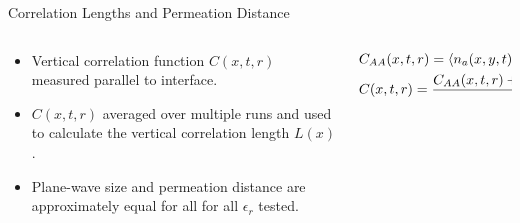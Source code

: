 \documentclass[aspectratio=169]{beamer}
\begin{document}
    \begin{frame}[t]{Correlation Lengths and Permeation Distance}
        \begin{columns}
            \begin{column}{0.3\textwidth}
                \vspace{-30pt}

                \begin{itemize}[leftmargin=1pt]
                \small
                    \item Vertical correlation function $ C(x,t, r) $ measured parallel
                        to interface.
                    \item $ C(x,t,r) $ averaged over multiple runs and used to calculate the vertical correlation length $ L(x) $.
                    \item Plane-wave size and permeation distance are approximately equal for all
                        for all $ \epsilon_r $ tested.
                \end{itemize}
            \end{column}
            \begin{column}{0.7\textwidth}
                
                \hfuzz=15pt
                \vspace{-15pt}

                \small{
                \begin{align*}
                    \hfill
                    &C_{AA}(x,t,r) = \braket{n_a(x, y, t)n_a(x, y+r, t)} - (a(x, t))^2
                    \hspace{-20pt} \\
                    \hfill
                    &C(x,t,r) =  \frac{C_{AA}(x,t,r) + C_{BB}(x,t,r) + C_{CC}(x,t,r)}{3}  
                    \hspace{-20pt}
                \end{align*}
                }

                \vspace{-25pt}


\end{column}
\end{columns}
\end{frame}
\end{document}
